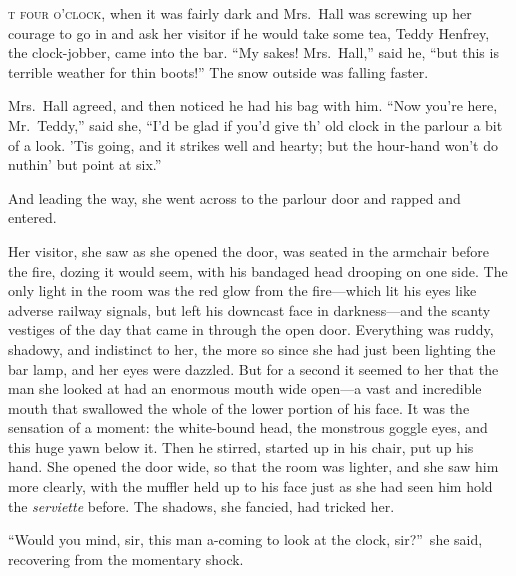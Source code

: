\label{ch:02}
\begin{ChapterStart}
\vspace*{2\nbs}

\vspace{1.5\nbs}
\vspace{0.75\nbs}
\end{ChapterStart}

\kern-11pt\textsc{t four o’clock,} when it was fairly dark and Mrs.\ Hall was screwing up her courage to go in and ask her visitor if he would take some tea, Teddy Henfrey, the clock-jobber, came into the bar. “My sakes! Mrs.\ Hall,” said he, “but this is terrible weather for thin boots!” The snow outside was falling faster.

Mrs.\ Hall agreed, and then noticed he had his bag with him. “Now you’re here, Mr.\ Teddy,” said she, “I’d be glad if you’d give th’ old clock in the parlour a bit of a look. ’Tis going, and it strikes well and hearty; but the hour-hand won’t do nuthin’ but point at six.”

And leading the way, she went across to the parlour door and rapped and entered.

Her visitor, she saw as she opened the door, was seated in the armchair before the fire, dozing it would seem, with his bandaged head drooping on one side. The only light in the room was the red glow from the fire—which lit his eyes like adverse railway signals, but left his downcast face in darkness—and the scanty vestiges of the day that came in through the open door. Everything was ruddy, shadowy, and indistinct to her, the more so since she had just been lighting the bar lamp, and her eyes were dazzled. But for a second it seemed to her that the man she looked at had an enormous mouth wide open—a vast and incredible mouth that swallowed the whole of the lower portion of his face. It was the sensation of a moment: the white-bound head, the monstrous goggle eyes, and this huge yawn below it. Then he stirred, started up in his chair, put up his hand. She opened the door wide, so that the room was lighter, and she saw him more clearly, with the muffler held up to his face just as she had seen him hold the \emph{serviette} before. The shadows, she fancied, had tricked her.

“Would you mind, sir, this man a-coming to look at the clock, sir?”\ she said, recovering from the momentary shock.


